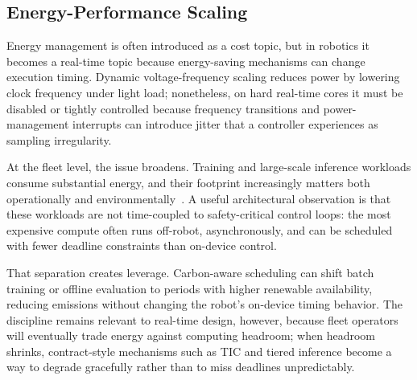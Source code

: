 \documentclass[smallextended]{svjour3}
\begin{document}
\subsection{Energy-Performance Scaling}

Energy management is often introduced as a cost topic, but in robotics it becomes a real-time topic because energy-saving mechanisms can change execution timing. Dynamic voltage-frequency scaling reduces power by lowering clock frequency under light load; nonetheless, on hard real-time cores it must be disabled or tightly controlled because frequency transitions and power-management interrupts can introduce jitter that a
controller experiences as sampling irregularity.

At the fleet level, the issue broadens. Training and large-scale inference workloads consume substantial energy, and their footprint increasingly matters both operationally and environmentally~\cite{strubell2019energy,patterson2021carbon}. A useful architectural observation is that these workloads are not time-coupled to safety-critical control loops: the most expensive compute often runs off-robot, asynchronously, and can be scheduled with fewer deadline constraints than on-device control.

That separation creates leverage. Carbon-aware scheduling can shift batch training or offline evaluation to periods with higher renewable availability, reducing emissions without changing the robot's on-device timing behavior. The discipline remains relevant to real-time design, however, because fleet operators will eventually trade energy against computing headroom; when headroom shrinks, contract-style mechanisms such
as TIC and tiered inference become a way to degrade gracefully rather than to miss deadlines unpredictably.
\end{document}
